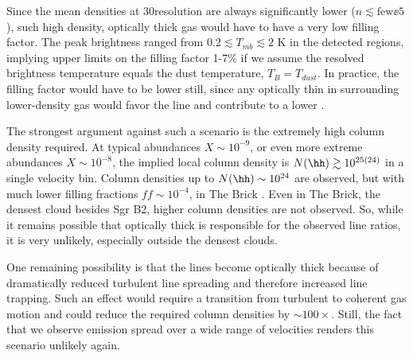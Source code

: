 Since the mean densities at 30\arcsec resolution are always significantly lower
($n\lesssim\mathrm{few}\ee{5}$ \percc), such high density,
optically thick gas would have to have a very low filling factor.  The peak
\para \threeohthree brightness ranged from $0.2 \lesssim T_{mb} \lesssim 2$ K
in the detected regions, implying upper limits on the filling factor 1-7\% if
we assume the resolved brightness temperature equals the dust temperature,
$T_B=T_{dust}$.
In practice, the filling factor would have to be lower still, since any
optically thin \para in surrounding lower-density gas would favor the
\threeohthree line and contribute to a lower \Rone.

The strongest argument against such a scenario is the extremely high column
density required.  At typical \para abundances $X\sim10^{-9}$, or even more
extreme abundances $X\sim10^{-8}$, the implied local column density is
$N(\hh)\gtrsim10^{25(24)}$ in a single velocity bin.  Column densities up to
$N(\hh)\sim10^{24}$ \percc are observed, but with much lower filling fractions
$ff\sim10^{-4}$, in The Brick \citep[][their Figure 4]{Rathborne2014a}.  Even
in The Brick, the densest cloud besides Sgr B2, higher column densities are not
observed.  So, while it remains possible that optically thick \para is
responsible for the observed line ratios, it is very unlikely, especially
outside the densest clouds.

One remaining possibility is that the \para lines become optically thick
because of dramatically reduced turbulent line spreading and therefore
increased line trapping.  Such an effect would require a transition from
turbulent to coherent gas motion \citep[e.g.][]{Pineda2010a} and could reduce
the required column densities by $\sim100\times$.  Still, the fact that we
observe \para emission spread over
a wide range of velocities renders this scenario unlikely again.



